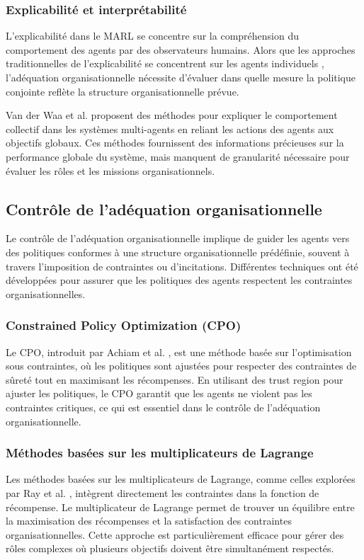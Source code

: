\documentclass[sigconf,anonymous]{aamas}
\begin{document}
\subsubsection{Explicabilité et interprétabilité}
L'explicabilité dans le MARL se concentre sur la compréhension du comportement des agents par des observateurs humains. Alors que les approches traditionnelles de l'explicabilité se concentrent sur les agents individuels \cite{van2018explainable}, l'adéquation organisationnelle nécessite d'évaluer dans quelle mesure la politique conjointe reflète la structure organisationnelle prévue.

Van der Waa et al. \cite{van2020explainability} proposent des méthodes pour expliquer le comportement collectif dans les systèmes multi-agents en reliant les actions des agents aux objectifs globaux. Ces méthodes fournissent des informations précieuses sur la performance globale du système, mais manquent de granularité nécessaire pour évaluer les rôles et les missions organisationnels.

\subsection{Contrôle de l'adéquation organisationnelle}
Le contrôle de l'adéquation organisationnelle implique de guider les agents vers des politiques conformes à une structure organisationnelle prédéfinie, souvent à travers l'imposition de contraintes ou d'incitations. Différentes techniques ont été développées pour assurer que les politiques des agents respectent les contraintes organisationnelles.

\subsubsection{Constrained Policy Optimization (CPO)}
Le CPO, introduit par Achiam et al. \cite{achiam2017cpo}, est une méthode basée sur l'optimisation sous contraintes, où les politiques sont ajustées pour respecter des contraintes de sûreté tout en maximisant les récompenses. En utilisant des trust region pour ajuster les politiques, le CPO garantit que les agents ne violent pas les contraintes critiques, ce qui est essentiel dans le contrôle de l'adéquation organisationnelle.

\subsubsection{Méthodes basées sur les multiplicateurs de Lagrange}
Les méthodes basées sur les multiplicateurs de Lagrange, comme celles explorées par Ray et al. \cite{ray2019benchmarking}, intègrent directement les contraintes dans la fonction de récompense. Le multiplicateur de Lagrange permet de trouver un équilibre entre la maximisation des récompenses et la satisfaction des contraintes organisationnelles. Cette approche est particulièrement efficace pour gérer des rôles complexes où plusieurs objectifs doivent être simultanément respectés.
\end{document}
